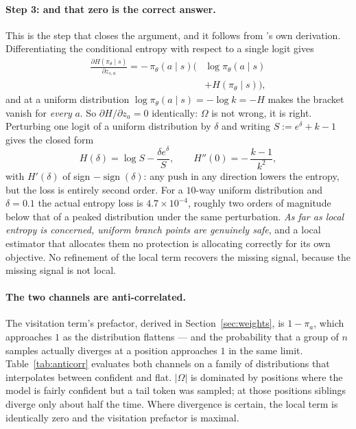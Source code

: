 \documentclass[11pt]{article}
\newcommand{\Om}{\Omega}
\newcommand{\pit}{\pi_{\theta}}
\begin{document}
\paragraph{Step 3: and that zero is the correct answer.}
This is the step that closes the argument, and it follows from
\citeauthor{steer}'s own derivation. Differentiating the conditional entropy with
respect to a single logit gives \citep[Eq.~20]{steer}
%
\begin{equation}
\begin{split}
\frac{\partial H(\pit \mid s)}{\partial z_{s,a}}
= -\,\pit(a \mid s)\bigl(&\log \pit(a \mid s)\\[-2pt]
  &+ H(\pit \mid s)\bigr),
\end{split}
\label{eq:dHdz}
\end{equation}
%
and at a uniform distribution $\log \pit(a \mid s) = -\log k = -H$ makes the bracket
vanish for \emph{every} $a$. So $\partial H / \partial z_a = 0$ identically: $\Om$
is not wrong, it is right. Perturbing one logit of a uniform distribution by $\delta$ and writing
$S := e^{\delta} + k - 1$ gives the closed form
%
\begin{equation}
H(\delta) = \log S - \frac{\delta e^{\delta}}{S},
\qquad
H''(0) = -\,\frac{k-1}{k^{2}},
\label{eq:secondorder}
\end{equation}
%
with $H'(\delta)$ of sign $-\operatorname{sign}(\delta)$: any push in any direction
lowers the entropy, but the loss is entirely second order. For a $10$-way uniform
distribution and $\delta = 0.1$ the actual entropy loss is $4.7\times10^{-4}$,
roughly two orders of magnitude below that of a peaked distribution under the same
perturbation. \emph{As far as local entropy is concerned, uniform branch points are
genuinely safe}, and a local estimator that allocates them no protection is
allocating correctly for its own objective. No refinement of the local term
recovers the missing signal, because the missing signal is not local.

\paragraph{The two channels are anti-correlated.}
The visitation term's prefactor, derived in Section~\ref{sec:weights}, is
$1 - \pi_a$, which approaches $1$ as the distribution flattens --- and the
probability that a group of $n$ samples actually diverges at a position approaches
$1$ in the same limit. Table~\ref{tab:anticorr} evaluates both channels on a family
of distributions that interpolates between confident and flat. $|\Om|$ is dominated
by positions where the model is fairly confident but a tail token was sampled; at
those positions siblings diverge only about half the time. Where divergence is
certain, the local term is identically zero and the visitation prefactor is maximal.
\end{document}
